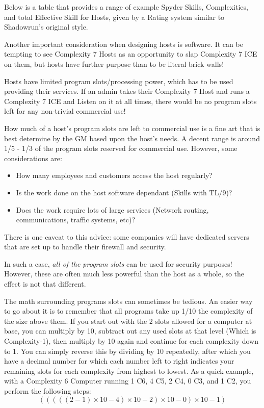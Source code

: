 \begin{multicols}{3}
	Below is a table that provides a range of example Spyder Skills, Complexities, and total Effective Skill for Hosts, given by a Rating system similar to Shadowrun's original style.
		
	Another important consideration when designing hosts is software. It can be tempting to see Complexity 7 Hosts as an opportunity to slap Complexity 7 ICE on them, but hosts have further purpose than to be literal brick walls!
	
	Hosts have limited program slots/processing power, which has to be used providing their services. If an admin takes their Complexity 7 Host and runs a Complexity 7 ICE and Listen on it at all times, there would be no program slots left for any non-trivial commercial use!
	
	How much of a host's program slots are left to commercial use is a fine art that is best determine by the GM based upon the host's needs. A decent range is around 1/5 - 1/3 of the program slots reserved for commercial use. However, some considerations are: 
	
	\begin{itemize}
		\itemsep 0pt
		\item How many employees and customers access the host regularly? 
		\item Is the work done on the host software dependant (Skills with TL/9)?
		\item Does the work require lots of large services (Network routing, communications, traffic systems, etc)?
	\end{itemize}
	
	There is one caveat to this advice: some companies will have dedicated servers that are set up to handle their firewall and security. 
	
	In such a case, \textit{all of the program slots} can be used for security purposes! However, these are often much less powerful than the host as a whole, so the effect is not that different.
	
	\begin{wrapfigure}[14]{l}{70pt}
		
	\end{wrapfigure}

	The math surrounding programs slots can sometimes be tedious. An easier way to go about it is to remember that all programs take up 1/10 the complexity of the size above them. If you start out with the 2 slots allowed for a computer at base, you can multiply by 10, subtract out any used slots at that level (Which is Complexity-1), then multiply by 10 again and continue for each complexity down to 1. You can simply reverse this by dividing by 10 repeatedly, after which you have a decimal number for which each number left to right indicates your remaining slots for each complexity from highest to lowest. As a quick example, with a Complexity 6 Computer running 1 C6, 4 C5, 2 C4, 0 C3, and 1 C2, you perform the following steps: \[(((((2 - 1) \times 10 - 4) \times 10  - 2) \times 10 - 0) \times 10 - 1)\]
	

\end{multicols}
